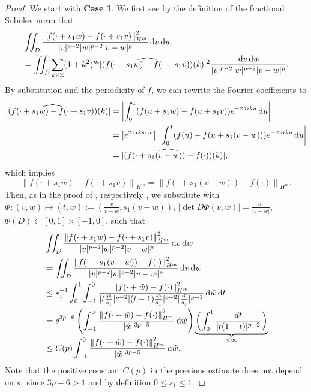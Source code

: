 \begin{proof}
	We start with \textbf{Case 1}. We first see by the definition of the fractional Sobolev norm that
	\begin{align*}
	& \iint_D   \frac{ \left\| f(\cdot+s_1w) - f(\cdot+s_1 v) \right\|^2_{H^m}}{|v|^{p-2}|w|^{p-2}|v-w|^{p}}  \,\mathrm{d} v \,\mathrm{d} w \\
	& = \iint_D  \sum_{k\in\mathbb{Z}} (1+k^2)^m  |(\widehat{f(\cdot+s_1w) - f(\cdot+s_1v)})(k)|^2   \frac{\,\mathrm{d} v \,\mathrm{d} w }{|v|^{p-2}|w|^{p-2}|v-w|^{p}} .
	\end{align*}
	By substitution and the periodicity of $f$, we can rewrite the Fourier coefficients to 
	\begin{align}\label{eq:FouriercoeffCOV}
	|\widehat{\left(f(\cdot+s_1w) - f(\cdot+s_1v)\right)}(k)| & =  \left|\int_0^1 (f(u+s_1w) -  f(u+s_1v)) e^{-2\pi i k u}\d u\right| \nonumber \\
	& =  \left|e^{2\pi i k s_1 w}\right| \, \left|\int_0^1 (f(u) -  f(u+s_1(v-w))) e^{-2\pi i k u}\d u\right| \nonumber \\
	& = |(\widehat{f(\cdot+s_1(v-w))-f(\cdot)})(k)|,
	\end{align}
	which implies 
	\[
	\left\| f(\cdot+s_1w) - f(\cdot+s_1 v) \right\|_{H^m} = \left\|  f(\cdot+s_1 (v-w)) - f(\cdot)\right\|_{H^m}.
	\]
	Then, as in the proof of \cite[Lemma 4.4]{BlattReiter:2015:Menger}, respectively \cite[Lemma 1]{BlattReiter:2015:Menger}, we substitute with $\Phi:(v,w) \mapsto (t,\tilde{w}):= (\frac{v}{v-w}, s_1(v-w))$, $|\det D\Phi(v,w)| = \frac{s_1}{|v-w|}$,  $\Phi(D)\subset [0,1]\times [-1,0]$, such that
	\begin{align*}
	&\iint_D   \frac{ \left\| f(\cdot+s_1w) - f(\cdot+s_1 v) \right\|^2_{H^m}}{|v|^{p-2}|w|^{p-2}|v-w|^{p}}  \,\mathrm{d} v \,\mathrm{d} w \\
    &  = \iint_D   \frac{ \left\|  f(\cdot+s_1 (v-w)) - f(\cdot)\right\|^2_{H^m}}{|v|^{p-2}|w|^{p-2}|v-w|^{p}}  \,\mathrm{d} v \,\mathrm{d} w \\
	& \leq  s_1^{-1} \int_0^1 \int_{-1}^0 \frac{ \left\|  f(\cdot+\tilde{w}) - f(\cdot)\right\|^2_{H^m}} {|t \frac{\tilde{w}}{s_1}|^{p-2}|(t-1)\frac{\tilde{w}}{s_1}|^{p-2}|\frac{\tilde{w}}{s_1}|^{p-1}}  \,\mathrm{d} \tilde{w} \,\mathrm{d} t \\
	& = s_1^{3p-6}  \left( \int_{-1}^{0} \frac{ \left\|  f(\cdot+\tilde{w}) - f(\cdot)\right\|^2_{H^m}}{|\tilde{w}|^{3p-5}} \,\mathrm{d} \tilde{w} \right) \smash{\underbrace{\left(\int_0^1 \frac{dt}{|t(1-t)|^{p-2}} \right)}_{< \infty}}\\
	& \leq C(p)  \int_{-1}^{0} \frac{ \left\|  f(\cdot+\tilde{w}) - f(\cdot)\right\|^2_{H^m}}{|\tilde{w}|^{3p-5}} \,\mathrm{d} \tilde{w}.
	\end{align*}
	Note that the positive constant $C(p)$ in the previous estimate does not depend on $s_1$ since $3p-6 >1$ and by definition  $0\leq s_1 \leq 1$.
	

\end{proof}
